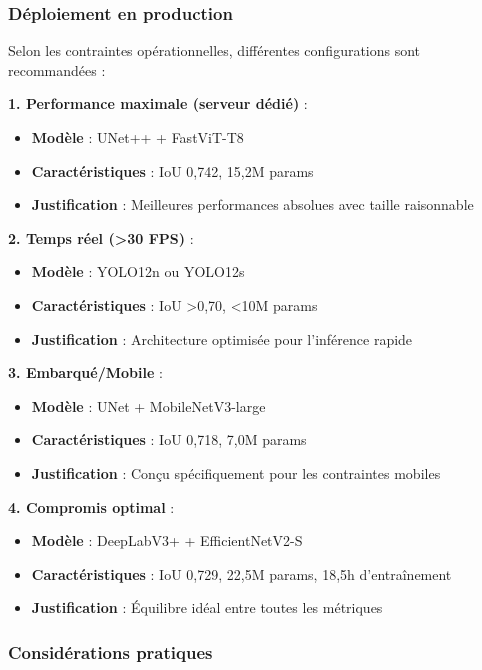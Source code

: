 \subsubsection{Déploiement en production}

Selon les contraintes opérationnelles, différentes configurations sont recommandées :

\textbf{1. Performance maximale (serveur dédié)} :
\begin{itemize}
    \item \textbf{Modèle} : UNet++ + FastViT-T8
    \item \textbf{Caractéristiques} : IoU 0,742, 15,2M params
    \item \textbf{Justification} : Meilleures performances absolues avec taille raisonnable
\end{itemize}

\textbf{2. Temps réel (>30 FPS)} :
\begin{itemize}
    \item \textbf{Modèle} : YOLO12n ou YOLO12s
    \item \textbf{Caractéristiques} : IoU >0,70, <10M params
    \item \textbf{Justification} : Architecture optimisée pour l'inférence rapide
\end{itemize}

\textbf{3. Embarqué/Mobile} :
\begin{itemize}
    \item \textbf{Modèle} : UNet + MobileNetV3-large
    \item \textbf{Caractéristiques} : IoU 0,718, 7,0M params
    \item \textbf{Justification} : Conçu spécifiquement pour les contraintes mobiles
\end{itemize}

\textbf{4. Compromis optimal} :
\begin{itemize}
    \item \textbf{Modèle} : DeepLabV3+ + EfficientNetV2-S
    \item \textbf{Caractéristiques} : IoU 0,729, 22,5M params, 18,5h d'entraînement
    \item \textbf{Justification} : Équilibre idéal entre toutes les métriques
\end{itemize}

\subsubsection{Considérations pratiques}

